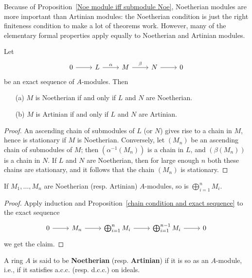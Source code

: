 Because of Proposition~\ref{Noe module iff submodule Noe}, Noetherian modules are more important than Artinian modules: the Noetherian condition is just the right finiteness condition to make a lot of theorems work. However, many of the elementary formal properties apply equally to Noetherian and Artinian modules.
\begin{proposition}\label{chain condition and exact sequence}
Let 
\[\begin{tikzcd}
0\ar[r]&L\ar[r,"\alpha"]&M\ar[r,"\beta"]&N\ar[r]&0
\end{tikzcd}\]
be an exact sequence of $A$-modules. Then
\begin{itemize}
\item[(a)] $M$ is Noetherian if and only if $L$ and $N$ are Noetherian.
\item[(b)] $M$ is Artinian if and only if $L$ and $N$ are Artinian.
\end{itemize}
\end{proposition}
\begin{proof}
An ascending chain of submodules of $L$ (or $N$) gives rise to a chain in $M$, hence is stationary if $M$ is Noetherian. Conversely, let $(M_n)$ be an ascending chain of submodules of $M$; then $(\alpha^{-1}(M_n))$ is a chain in $L$, and $(\beta(M_n))$ is a chain in $N$. If $L$ and $N$ are Noetherian, then for large enough $n$ both these chains are stationary, and it follows that the chain $(M_n)$ is stationary.
\end{proof}
\begin{proposition}\label{Noe module sum}
If $M_1,\dots,M_n$ are Noetherian (resp. Artinian) $A$-modules, so is $\bigoplus_{i=1}^{n}M_i$.
\end{proposition}
\begin{proof}
Apply induction and Proposition~\ref{chain condition and exact sequence} to the exact sequence
\[\begin{tikzcd}
0\ar[r]&M_n\ar[r]&\bigoplus_{i=1}^nM_i\ar[r]&\bigoplus_{i=1}^{n-1}M_i\ar[r]&0
\end{tikzcd}\]
we get the claim.
\end{proof}
A ring $A$ is said to be \textbf{Noetherian} (resp. \textbf{Artinian}) if it is so as an $A$-module, i.e., if it satisfies a.c.c. (resp. d.c.c.) on ideals.
